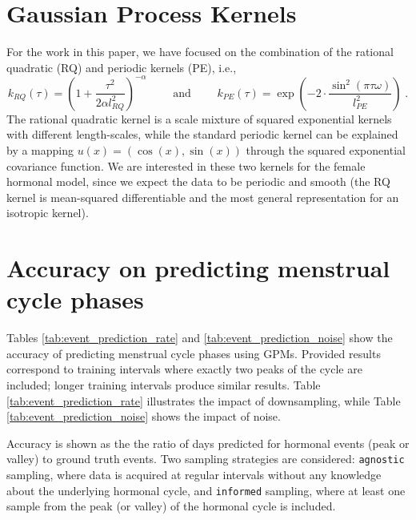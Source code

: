 \documentclass{article}
\newcommand{\ie}{i.e., }
\begin{document}
\section{Gaussian Process Kernels}
\label{app:gpm_kernels}

For the work in this paper, we have focused on the combination of the rational quadratic (RQ) and periodic kernels (PE), \ie
\begin{equation}
k_{RQ}(\tau) = \left(1 + \frac{\tau^2}{2 \alpha l_{RQ}^2}\right)^{-\alpha} \qquad \text{ and } \qquad k_{PE}(\tau) = \exp\left(-2 \cdot \frac{\sin^2(\pi \tau \omega)}{l_{PE}^2}\right) \; .
\end{equation}
The rational quadratic kernel is a scale mixture of squared exponential kernels with different length-scales, while the standard periodic kernel can be explained by a mapping $u(x) = (\cos(x), \sin(x))$ through the squared exponential covariance function. We are interested in these two kernels for the female hormonal model, since we expect the data to be periodic and smooth (the RQ kernel is mean-squared differentiable and the most general representation for an isotropic kernel).

\section{Accuracy on predicting menstrual cycle phases}
\label{app:event_prediction_tables}

Tables \ref{tab:event_prediction_rate} and \ref{tab:event_prediction_noise} show the accuracy of predicting menstrual cycle phases using GPMs. Provided results correspond to training intervals where exactly two peaks of the cycle are included; longer training intervals produce similar results. Table \ref{tab:event_prediction_rate} illustrates the impact of downsampling, while Table \ref{tab:event_prediction_noise} shows the impact of noise.

Accuracy is shown as the the ratio of days predicted for hormonal events (peak or valley) to ground truth events. Two sampling strategies are considered: \texttt{agnostic} sampling, where data is acquired at regular intervals without any knowledge about the underlying hormonal cycle, and \texttt{informed} sampling, where at least one sample from the peak (or valley) of the hormonal cycle is included.




\end{document}
